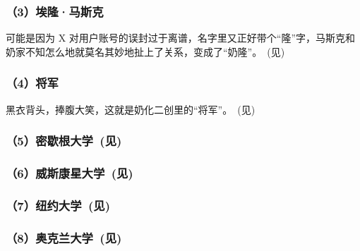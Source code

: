 \subsubsection{（3）埃隆·马斯克}

可能是因为 X 对用户账号的误封过于离谱，名字里又正好带个“隆”字，马斯克和奶家不知怎么地就莫名其妙地扯上了关系，变成了“奶隆”。~(见)



\subsubsection{（4）将军}

黑衣背头，捧腹大笑，这就是奶化二创里的“将军”。~(见)



\subsubsection[（5）密歇根大学]{（5）密歇根大学~(见)}



\clearpage
\subsubsection[（6）威斯康星大学]{（6）威斯康星大学~(见)}



\subsubsection[（7）纽约大学]{（7）纽约大学~(见)}



\subsubsection[（8）奥克兰大学]{（8）奥克兰大学~(见)}



